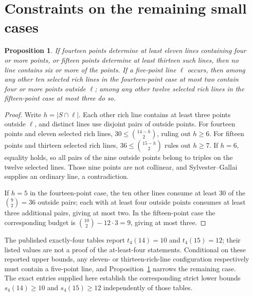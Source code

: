 \documentclass[11pt,a4paper]{amsart}
\newtheorem{proposition}[theorem]{Proposition}
\theoremstyle{remark}\newtheorem{remark}[theorem]{Remark}
\begin{document}
\section{Constraints on the remaining small cases}\label{sec:remaining}
\begin{proposition}\label{prop:smalllongline}
If fourteen points determine at least eleven lines containing four or more points, or fifteen points determine at least thirteen such lines, then no line contains six or more of the points. If a five-point line $\ell$ occurs, then among any other ten selected rich lines in the fourteen-point case at most two contain four or more points outside $\ell$; among any other twelve selected rich lines in the fifteen-point case at most three do so.
\end{proposition}
\begin{proof}
Write $h=|S\cap\ell|$. Each other rich line contains at least three points outside $\ell$, and distinct lines use disjoint pairs of outside points. For fourteen points and eleven selected rich lines, $30\le\binom{14-h}{2}$, ruling out $h\ge6$. For fifteen points and thirteen selected rich lines, $36\le\binom{15-h}{2}$ rules out $h\ge7$. If $h=6$, equality holds, so all pairs of the nine outside points belong to triples on the twelve selected lines. Those nine points are not collinear, and Sylvester--Gallai supplies an ordinary line, a contradiction.

If $h=5$ in the fourteen-point case, the ten other lines consume at least $30$ of the $\binom92=36$ outside pairs; each with at least four outside points consumes at least three additional pairs, giving at most two. In the fifteen-point case the corresponding budget is $\binom{10}2-12\cdot3=9$, giving at most three.
\end{proof}
The published exactly-four tables \cite{OEISreal,MathWorld} report $t_4(14)=10$ and $t_4(15)=12$; their listed values are not a proof of the at-least-four statements. Conditional on these reported upper bounds, any eleven- or thirteen-rich-line configuration respectively must contain a five-point line, and Proposition~\ref{prop:smalllongline} narrows the remaining case. The exact entries supplied here establish the corresponding strict lower bounds $s_4(14)\ge10$ and $s_4(15)\ge12$ independently of those tables.
\end{document}
